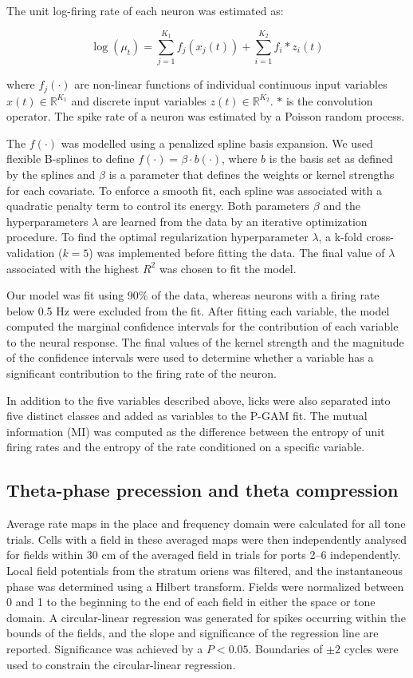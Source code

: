 The unit log-firing rate of each neuron was estimated as:

\[
\log(\mu_t) = \sum_{j=1}^{K_1} f_j(x_j(t)) + \sum_{i=1}^{K_2} f_i * z_i(t)
\]

where $f_j(\cdot)$ are non-linear functions of individual continuous input variables $x(t) \in \mathbb{R}^{K_1}$ and discrete input variables $z(t) \in \mathbb{R}^{K_2}$. $*$ is the convolution operator. The spike rate of a neuron was estimated by a Poisson random process.

The $f(\cdot)$ was modelled using a penalized spline basis expansion. We used flexible B-splines to define $f(\cdot) = \beta \cdot b(\cdot)$, where $b$ is the basis set as defined by the splines and $\beta$ is a parameter that defines the weights or kernel strengths for each covariate. To enforce a smooth fit, each spline was associated with a quadratic penalty term to control its energy. Both parameters $\beta$ and the hyperparameters $\lambda$ are learned from the data by an iterative optimization procedure. To find the optimal regularization hyperparameter $\lambda$, a k-fold cross-validation ($k = 5$) was implemented before fitting the data. The final value of $\lambda$ associated with the highest $R^2$ was chosen to fit the model.

Our model was fit using 90\% of the data, whereas neurons with a firing rate below 0.5 Hz were excluded from the fit. After fitting each variable, the model computed the marginal confidence intervals for the contribution of each variable to the neural response. The final values of the kernel strength and the magnitude of the confidence intervals were used to determine whether a variable has a significant contribution to the firing rate of the neuron.

In addition to the five variables described above, licks were also separated into five distinct classes and added as variables to the P-GAM fit. The mutual information (MI) was computed as the difference between the entropy of unit firing rates and the entropy of the rate conditioned on a specific variable.

\subsection{Theta-phase precession and theta compression}

Average rate maps in the place and frequency domain were calculated for all tone trials. Cells with a field in these averaged maps were then independently analysed for fields within 30 cm of the averaged field in trials for ports 2--6 independently. Local field potentials from the stratum oriens was filtered, and the instantaneous phase was determined using a Hilbert transform. Fields were normalized between 0 and 1 to the beginning to the end of each field in either the space or tone domain. A circular-linear regression was generated for spikes occurring within the bounds of the fields, and the slope and significance of the regression line are reported. Significance was achieved by a $P < 0.05$. Boundaries of $\pm 2$ cycles were used to constrain the circular-linear regression.

